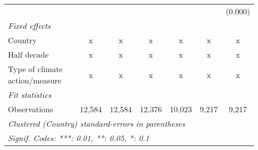 \begin{tabular}{lcccccc}
                                        &         &         &         &         &         & (0.000)\\   
   \emph{Fixed effects}\\
   Country                              & x       & x       & x       & x       & x       & x\\  
   Half decade                          & x       & x       & x       & x       & x       & x\\  
   Type of climate action/measure       & x       & x       & x       & x       & x       & x\\  
   \midrule \emph{Fit statistics}\\
   Observations                         & 12,584  & 12,584  & 12,376  & 10,023  & 9,217   & 9,217\\  
   \midrule
   \multicolumn{7}{l}{\emph{Clustered (Country) standard-errors in parentheses}}\\
   \multicolumn{7}{l}{\emph{Signif. Codes: ***: 0.01, **: 0.05, *: 0.1}}\\
\end{tabular}
\par\endgroup


